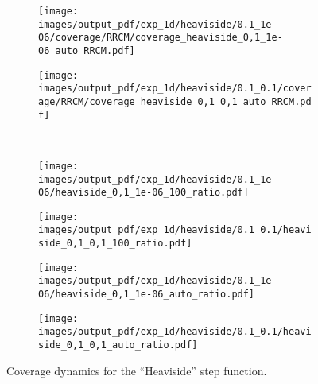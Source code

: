 \documentclass[a4paper,14pt]{extarticle}
\begin{document}
\begin{figure}
\begin{subfigure}[b]{0.25\linewidth}
  \end{subfigure}%
  \begin{subfigure}[b]{0.25\linewidth}
    \texttt{[image: images/output\_pdf/exp\_1d/heaviside/0.1\_1e-06/coverage/RRCM/coverage\_heaviside\_0,1\_1e-06\_auto\_RRCM.pdf]}
  \end{subfigure}%
  \begin{subfigure}[b]{0.25\linewidth}
    \texttt{[image: images/output\_pdf/exp\_1d/heaviside/0.1\_0.1/coverage/RRCM/coverage\_heaviside\_0,1\_0,1\_auto\_RRCM.pdf]}
  \end{subfigure}\\
  \begin{subfigure}[b]{0.25\linewidth}
    \texttt{[image: images/output\_pdf/exp\_1d/heaviside/0.1\_1e-06/heaviside\_0,1\_1e-06\_100\_ratio.pdf]}
    \caption{} \label{fig:heaviside_1d_high_noise_c1}
  \end{subfigure}%
  \begin{subfigure}[b]{0.25\linewidth}
    \texttt{[image: images/output\_pdf/exp\_1d/heaviside/0.1\_0.1/heaviside\_0,1\_0,1\_100\_ratio.pdf]}
    \caption{} \label{fig:heaviside_1d_high_noise_c2}
  \end{subfigure}%
  \begin{subfigure}[b]{0.25\linewidth}
    \texttt{[image: images/output\_pdf/exp\_1d/heaviside/0.1\_1e-06/heaviside\_0,1\_1e-06\_auto\_ratio.pdf]}
    \caption{} \label{fig:heaviside_1d_high_noise_c3}
  \end{subfigure}%
  \begin{subfigure}[b]{0.25\linewidth}
    \texttt{[image: images/output\_pdf/exp\_1d/heaviside/0.1\_0.1/heaviside\_0,1\_0,1\_auto\_ratio.pdf]}
    \caption{} \label{fig:heaviside_1d_high_noise_c4}
  \end{subfigure}%
  \caption{Coverage dynamics for the ``Heaviside'' step function.}
  \label{fig:heaviside_1d_high_noise}
\end{figure}
\end{document}
